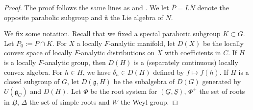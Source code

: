 \documentclass[a4paper]{amsart}
\numberwithin{equation}{section}
\theoremstyle{remark}
\theoremstyle{definition}
\newcommand{\alggrp}[1]{\underline{#1}}
\renewcommand{\o}[1]{\overline{#1}}
\begin{document}
\begin{proof}
  The proof follows the same lines as \cite[Theorem~3.5]{orlik-schraen} and \cite[Proposition~2.4]{socle1}.
  We let $\o P = L\o N$ denote the opposite parabolic subgroup and $\o{\mathfrak n}$ the Lie algebra of $\o N$.

  We fix some notation.
  Recall that we fixed a special parahoric subgroup $K\subset G$.
  Let $P_0 := P \cap K$.
  For $X$ a locally $F$-analytic manifold, let $D(X)$ be the locally convex space of locally $F$-analytic distributions on $X$ with coefficients in $C$.
  If $H$ is a locally $F$-analytic group, then $D(H)$ is a (separately continuous) locally convex algebra.
  For $h\in H$, we have $\delta_{h}\in D(H)$ defined by $f\mapsto f(h)$.
  If $H$ is a closed subgroup of $G$,   let $D(\mathfrak{g},H)$ be the subalgebra of $D(G)$ generated by $U(\mathfrak{g}_{C})$ and $D(H)$.
  Let $\Phi$ be the root system for $(\alggrp G,\alggrp S)$, $\Phi^{+}$ the set of roots in $\alggrp B$, $\Delta$ the set of simple roots and $W$ the Weyl group.
  

\end{proof}
\end{document}
